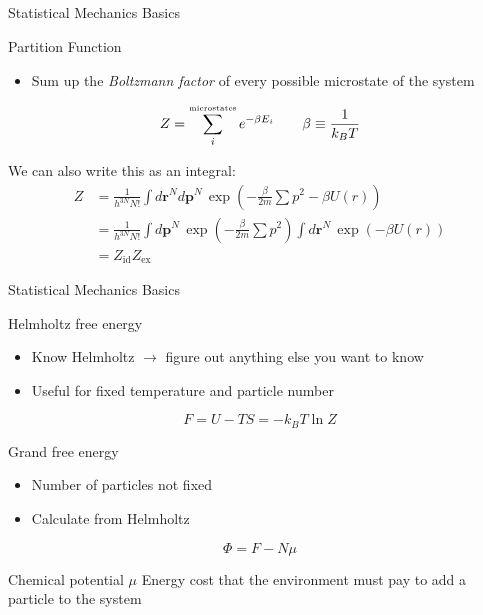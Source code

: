 \documentclass[xcolor=dvipsnames]{beamer}
\newcommand{\kT}{\ensuremath{k_{B}T}}
\newcommand{\rr}{\ensuremath{\mathbf{r}}}
\newcommand{\pp}{\ensuremath{\mathbf{p}}}
\begin{document}
\subsection{} %
\begin{frame}{Statistical Mechanics Basics}
  \begin{block}{Partition Function}
    \begin{itemize}
      \item Sum up the \emph{Boltzmann factor} of every possible microstate of the system
    \end{itemize}
     \[ Z = \sum_i^\text{\tiny{microstates}}e^{-\beta E_i} \quad\quad  \beta \equiv \frac{1}{\kT} \]
  \end{block}

  We can also write this as an integral:
  \begin{align*}
    Z &= \frac{1}{h^{3N}N!}\int d\rr^N d\pp^N\, \exp\left( -\frac{\beta}{2m}\sum p^2 - \beta U(r) \right) \\
    &= \frac{1}{h^{3N}N!}\int d\pp^N\, \exp\left( -\frac{\beta}{2m}\sum p^2 \right)\int d\rr^N\, \exp(-\beta U(r)) \\
    &= Z_\text{id}Z_\text{ex}
  \end{align*}

\end{frame}

\begin{frame}{Statistical Mechanics Basics}
  \begin{block}{Helmholtz free energy}
    \begin{itemize}
      \item Know Helmholtz $\rightarrow$ figure out anything else you want to know
      \item Useful for fixed temperature and particle number
    \end{itemize}
    \[ F = U - TS = -k_BT\ln Z \]
  \end{block}

  \begin{block}{Grand free energy}
    \begin{itemize}
      \item Number of particles not fixed
      \item Calculate from Helmholtz
    \end{itemize}
    \[ \varPhi = F - N\mu \]
  \end{block}

  \begin{block}{Chemical potential $\mu$}
    Energy cost that the environment must pay to add a particle to the system
  \end{block}
\end{frame}
\end{document}
